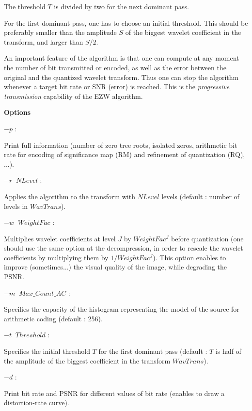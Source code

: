 \begin{itemize}
The threshold $T$ is divided by two for the next dominant pass.  

\end{itemize} 

For the first dominant pass, one has to choose an initial threshold. 
This should be preferably smaller than the amplitude $S$ of the biggest 
wavelet coefficient in the transform, and larger than $S/2$. 

An important feature of the algorithm is that one can compute at any moment 
the number of bit transmitted or encoded, as well as the error between 
the original and the quantized wavelet transform. Thus one can stop 
the algorithm whenever a target bit rate or SNR (error) is reached. 
This is the {\em progressive transmission} capability of the EZW algorithm. 
\newline 

{\bf Options} 
\newline 

$-p$ : \parbox[t]{15.2cm}{Print full information (number of zero tree roots, 
isolated zeros, arithmetic bit rate for encoding of significance map (RM) 
and refinement of quantization (RQ), ...).}
\newline 

$-r \;\; NLevel$ :  \parbox[t]{12.9cm}{Applies the algorithm 
to the transform with $NLevel$ levels (default : number of levels 
in $WavTrans$). }
\newline 

$-w \;\; WeightFac$ :  \parbox[t]{13.0cm}{Multiplies wavelet coefficients 
at level $J$ by $WeightFac^J$ before quantization (one should use the same 
option at the decompression, in order to rescale the wavelet coefficients 
by multiplying them by $1/WeightFac^J$). This option enables to improve 
(sometimes...) the visual quality of the image, while degrading the PSNR. }
\newline 

$-m \;\; Max\mbox{\_}Count\mbox{\_}AC$ : \parbox[t]{12.1cm}{Specifies 
the capacity of the histogram representing the model of the source 
for arithmetic coding (default : 256).} 
\newline 

$-t \;\; Threshold$ : \parbox[t]{13.3cm}{Specifies the initial threshold $T$ 
for the first dominant pass (default : $T$ is half of the amplitude 
of the biggest coefficient in the transform $WavTrans$). }
\newline 

$-d$ : \parbox[t]{15.2cm}{Print bit rate and PSNR for different values of 
bit rate (enables to draw a distortion-rate curve). }
\newline 


